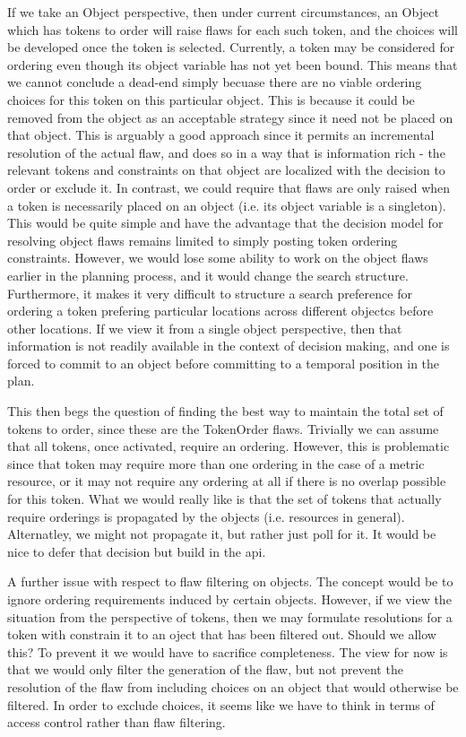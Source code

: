 \documentclass[10pt, letterpaper, oneside]{article}
\begin{document}
If we take an Object perspective, then under current circumstances, an Object which has tokens to order will raise flaws for each such token, and the choices will be developed once the token is selected. Currently, a token may be considered for ordering even though its object variable has not yet been bound. This means that we cannot conclude a dead-end simply becuase there are no viable ordering choices for this token on this particular object. This is because it could be removed from the object as an acceptable strategy since it need not be placed on that object. This is arguably a good approach since it permits an incremental resolution of the actual flaw, and does so in a way that is information rich - the relevant tokens and constraints on that object are localized with the decision to order or exclude it. In contrast, we could require that flaws are only raised when a token is necessarily placed on an object (i.e. its object variable is a singleton). This would be quite simple and have the advantage that the decision model for resolving object flaws remains limited to simply posting token ordering constraints. However, we would lose some ability to work on the object flaws earlier in the planning process, and it would change the search structure. Furthermore,  it makes it very difficult to structure a search preference for ordering a token prefering particular locations across different objectcs before other locations. If we view it from a single object perspective, then that information is not readily available in the context of decision making, and one is forced to commit to an object before committing to a temporal position in the plan.

This then begs the question of finding the best way to maintain the total set of tokens to order, since these are the TokenOrder flaws. Trivially we can assume that all tokens, once activated, require an ordering. However, this is problematic since that token may require more than one ordering in the case of a metric resource, or it may not require any ordering at all if there is no overlap possible for this token. What we would really like is that the set of tokens that actually require orderings is propagated by the objects (i.e. resources in general). Alternatley, we might not propagate it, but rather just poll for it. It would be nice to defer that decision but build in the api.

A further issue with respect to flaw filtering on objects. The concept would be to ignore ordering requirements induced by certain objects. However, if we view the situation from the perspective of tokens, then we may formulate resolutions for a token with constrain it to an oject that has been filtered out. Should we allow this? To prevent it we would have to sacrifice completeness. The view for now is that we would only filter the generation of the flaw, but not prevent the resolution of the flaw from including choices on an object that would otherwise be filtered. In order to exclude choices, it seems like we have to think in terms of access control rather than flaw filtering.
\end{document}
